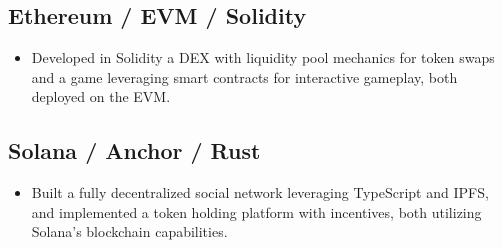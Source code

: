 \documentclass[a4paper, 12pt]{article}
\begin{document}
\subsection{Ethereum / EVM / Solidity}
\begin{itemize}
  \item Developed in Solidity a DEX with liquidity pool mechanics for token swaps and a game leveraging smart contracts for interactive gameplay, both deployed on the EVM. 
\end{itemize}


\subsection{Solana / Anchor / Rust}
\begin{itemize}
  \item Built a fully decentralized social network leveraging TypeScript and IPFS, and implemented a token holding platform with incentives, both utilizing Solana's blockchain capabilities.
\end{itemize}
\end{document}
